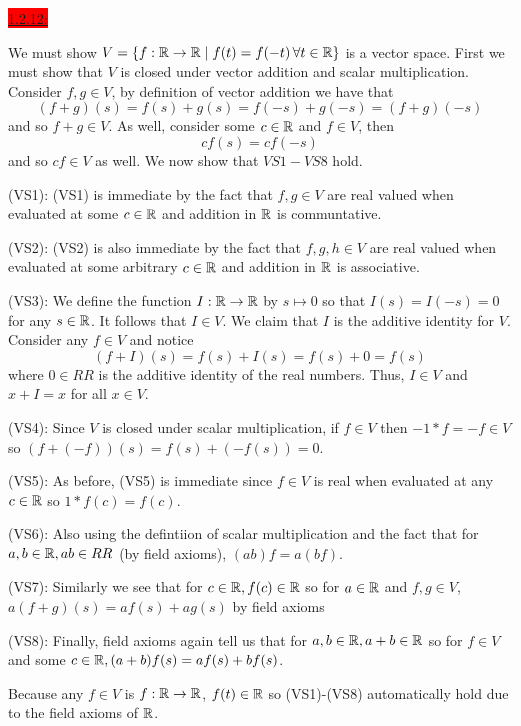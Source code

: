 \documentclass{exam}
\begin{document}
  \colorbox{red}{\underline{1.2.12:}}
  \begin{solution}
    We must show $V = \left\{f: \mathbb R \to \mathbb R \mid f(t) = f(-t)\, \forall t \in \mathbb R \right\}$ is a vector space. First we must show that $V$ is closed under vector addition and scalar multiplication. Consider $f, g \in V$, by definition of vector addition we have that 
    \[
      (f + g)(s) = f(s) + g(s) = f(-s) + g(-s) = (f + g)(-s)
    \] and so $f + g \in V$. As well, consider some $c \in \mathbb R$ and $f \in V$, then
    \[
      cf(s) = cf(-s)
    \]
    and so $cf \in V$ as well. We now show that $VS1 - VS8$ hold. 

    \hspace{0.5cm}(VS1): (VS1) is immediate by the fact that $f, g \in V$ are real valued when evaluated at some $c \in \mathbb R$ and addition in $\mathbb R$ is communtative. 

    \hspace{0.5cm}(VS2): (VS2) is also immediate by the fact that $f, g, h \in V$ are real valued when evaluated at some arbitrary $c \in \mathbb R$ and addition in $\mathbb R$ is associative.

    \hspace{0.5cm}(VS3): We define the function $I: \mathbb R \to \mathbb R$ by $s \mapsto 0$ so that $I(s) = I(-s) = 0$ for any $s \in \mathbb R$. It follows that $I \in V$. We claim that $I$ is the additive identity for $V$. Consider any $f \in V$ and notice 
    \[
      (f + I)(s) = f(s) + I(s) = f(s) + 0 = f(s)    
    \] 
    where $0 \in RR$ is the additive identity of the real numbers. Thus, $I \in V$ and $x + I = x$ for all $x \in V$.

    \hspace{0.5cm}(VS4): Since $V$ is closed under scalar multiplication, if $f \in V$ then $-1 * f = -f \in V$ so $(f + (-f))(s) = f(s) + (-f(s)) = 0$.

    \hspace{0.5cm}(VS5): As before, (VS5) is immediate since $f \in V$ is real when evaluated at any $c \in \mathbb R$ so $1 * f(c) = f(c)$.

    \hspace{0.5cm}(VS6): Also using the defintiion of scalar multiplication and the fact that for $a, b \in \mathbb R, ab \in RR$ (by field axioms), $(ab)f = a(bf)$.

    \hspace{0.5cm}(VS7): Similarly we see that for $c \in \mathbb R, f(c) \in \mathbb R$ so for $a \in \mathbb R$ and $f, g \in V$, $a(f + g)(s) = af(s) + ag(s)$ by field axioms

    \hspace{0.5cm}(VS8): Finally, field axioms again tell us that for $a, b \in \mathbb R, a + b \in \mathbb R$ so for $f \in V$ and some $c \in \mathbb R, (a + b) f(s) = af(s) + bf(s)$.

    Because any $f \in V$ is $f: \mathbb R \to \mathbb R$, $f(t) \in \mathbb R$ so (VS1)-(VS8) automatically hold due to the field axioms of $\mathbb R$.
  \end{solution}
\end{document}
